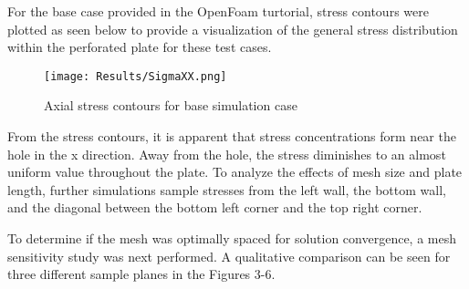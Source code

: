 \documentclass[twocolumn,10pt]{asme2ej}
\begin{document}
For the base case provided in the OpenFoam turtorial, stress contours were plotted as seen below to provide a visualization of the general stress distribution within the perforated plate for these test cases.

\begin{figure}[htb]
\begin{center}
\texttt{[image: Results/SigmaXX.png]}
\caption{Axial stress contours for base simulation case}
\end{center}
\end{figure}

From the stress contours, it is apparent that stress concentrations form near the hole in the x direction.  Away from the hole, the stress diminishes to an almost uniform value throughout the plate.  To analyze the effects of mesh size and plate length, further simulations sample stresses from the left wall, the bottom wall, and the diagonal between the bottom left corner and the top right corner.

To determine if the mesh was optimally spaced for solution convergence, a mesh sensitivity study was next performed.  A qualitative comparison can be seen for three different sample planes in the Figures 3-6.

\end{document}
